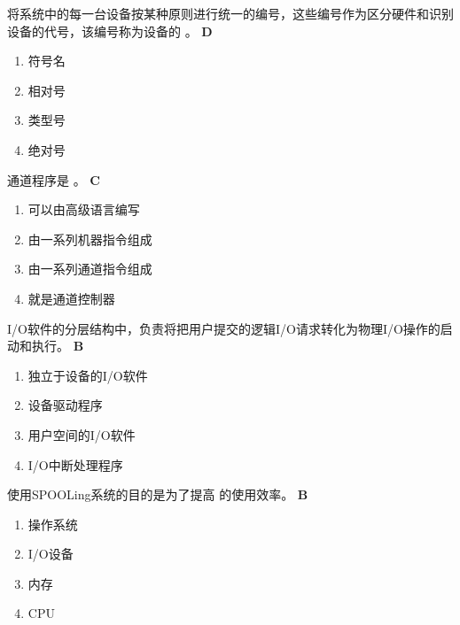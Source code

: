 \begin{problem}
	‌将系统中的每一台设备按某种原则进行统一的编号，这些编号作为区分硬件和识别设备的代号，该编号称为设备的 \myline。
	\textbf{D}
	\vspace{-0.5em}
	\begin{multicols}{4}
		\begin{enumerate}[label=\Alph*.]
			\item 符号名
			\item 相对号
			\item 类型号
			\item 绝对号
		\end{enumerate}
	\end{multicols}
	\vspace{-1em}
\end{problem}


\begin{problem}
	通道程序是 \myline。
	\textbf{C}
	\vspace{-0.5em}
	\begin{multicols}{2}
		\begin{enumerate}[label=\Alph*.]
			\item 可以由高级语言编写
			\item 由一系列机器指令组成
			\item 由一系列通道指令组成
			\item 就是通道控制器
		\end{enumerate}
	\end{multicols}
	\vspace{-1em}
\end{problem}


\begin{problem}
	I/O软件的分层结构中，\myline 负责将把用户提交的逻辑I/O请求转化为物理I/O操作的启动和执行。
	\textbf{B}
	\vspace{-0.5em}
	\begin{multicols}{2}
		\begin{enumerate}[label=\Alph*.]
			\item 独立于设备的I/O软件
			\item 设备驱动程序
			\item 用户空间的I/O软件
			\item I/O中断处理程序
		\end{enumerate}
	\end{multicols}
	\vspace{-1em}
\end{problem}


\begin{problem}
	使用SPOOLing系统的目的是为了提高 \myline 的使用效率。
	\textbf{B}
	\vspace{-0.5em}
	\begin{multicols}{4}
		\begin{enumerate}[label=\Alph*.]
			\item 操作系统
			\item I/O设备
			\item 内存
			\item CPU
		\end{enumerate}
	\end{multicols}
	\vspace{-1em}
\end{problem}


